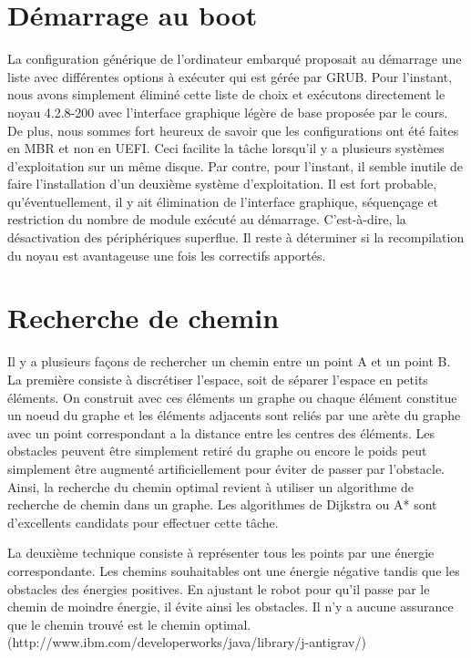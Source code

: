 \section{Démarrage au boot}
La configuration générique de l'ordinateur embarqué proposait au démarrage une liste avec différentes options à exécuter qui est gérée par GRUB. Pour l'instant, nous avons simplement éliminé
cette liste de choix et exécutons directement le noyau 4.2.8-200 avec l'interface graphique légère de base proposée par le cours. De plus, nous sommes fort heureux de savoir que les configurations
ont été faites en MBR et non en UEFI. Ceci facilite la tâche lorsqu'il y a plusieurs systèmes d'exploitation sur un même disque. Par contre, pour l'instant, il semble inutile de faire l'installation
d'un deuxième système d'exploitation. Il est fort probable, qu'éventuellement, il y ait élimination de l'interface graphique, séquençage et restriction du nombre de module exécuté au démarrage.
C'est-à-dire, la désactivation des périphériques superflue. Il reste à déterminer si la recompilation du noyau est avantageuse une fois les correctifs apportés.


\section{Recherche de chemin}
Il y a plusieurs façons de rechercher un chemin entre un point A et un point B.
La première consiste à discrétiser l'espace, soit de séparer l'espace en
petits éléments.  On construit avec ces éléments un graphe ou chaque élément
constitue un noeud du graphe et les éléments adjacents sont reliés par une arète
du graphe avec un point correspondant a la distance entre les centres des
éléments.  Les obstacles peuvent être simplement retiré du graphe ou encore le
poids peut simplement être augmenté artificiellement pour éviter de passer par
l'obstacle.  Ainsi, la recherche du chemin optimal revient à utiliser un
algorithme de recherche de chemin dans un graphe.  Les algorithmes de Dijkstra
ou A* sont d'excellents candidats pour effectuer cette tâche.

La deuxième technique consiste à représenter tous les points par une énergie
correspondante.  Les chemins souhaitables ont une énergie négative tandis que
les obstacles des énergies positives.  En ajustant le robot pour qu'il passe par
le chemin de moindre énergie, il évite ainsi les obstacles.  Il n'y a aucune
assurance que le chemin trouvé est le chemin optimal.
(http://www.ibm.com/developerworks/java/library/j-antigrav/)

